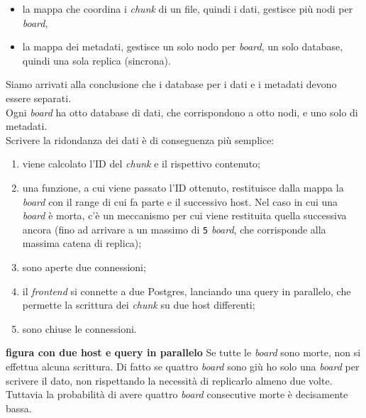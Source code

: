 \begin{itemize}
\item 
la mappa che coordina i \textit{chunk} di un file, quindi i dati, gestisce pi\`{u} nodi per \textit{board},
\item
la mappa dei metadati, gestisce un solo nodo per \textit{board}, un solo database, quindi una sola replica (sincrona).
\end{itemize}

Siamo arrivati alla conclusione che i database per i dati e i metadati devono essere separati.\\
Ogni \textit{board} ha otto database di dati, che corrispondono a otto nodi, e uno solo di metadati.\\
Scrivere la ridondanza dei dati \`{e} di conseguenza pi\`{u} semplice: 

\begin{enumerate}
\item
viene calcolato l'ID del \textit{chunk} e il rispettivo contenuto;
\item
una funzione, a cui viene passato l'ID ottenuto, restituisce dalla mappa la \textit{board} con il range di cui fa parte e il successivo host. Nel caso in cui una \textit{board} \`{e} morta, c'\`{e} un meccanismo per cui viene restituita quella successiva ancora (fino ad arrivare a un massimo di \verb"5" \textit{board}, che corrisponde alla massima catena di replica); 
\item 
sono aperte due connessioni;
\item
il \textit{frontend} si connette a due Postgres, lanciando una query in parallelo, che permette la scrittura dei \textit{chunk} su due host differenti;
\item
sono chiuse le connessioni.
\end{enumerate}

\textbf{figura con due host e query in parallelo}
Se tutte le \textit{board} sono morte, non si effettua alcuna scrittura. Di fatto se quattro \textit{board} sono gi\`{u} ho solo una \textit{board} per scrivere il dato, non rispettando la necessit\`{a} di replicarlo almeno due volte.\\
Tuttavia la probabilit\`{a} di avere quattro \textit{board} consecutive morte \`{e} decisamente bassa.\\

